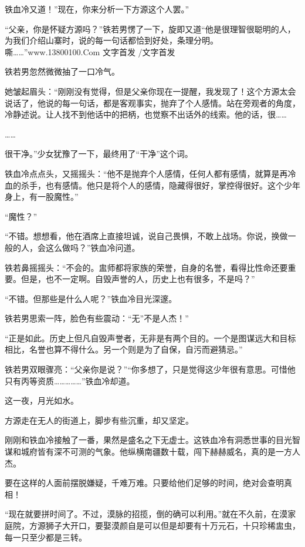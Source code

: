 
\begin{this_body}

铁血冷又道！”现在，你来分析一下方源这个人罢。”

“父亲，你是怀疑方源吗？”铁若男愣了一下，旋即又道“他是很理智很聪明的人，为我们介绍山寨时，说的每一句话都恰到好处，条理分明。嘶……”www.13800100.Com 文字首发 /文字首发

铁若男忽然微微抽了一口冷气。

她皱起眉头：“刚刚没有觉得，但是父亲你现在一提醒，我发现了！这个方源太会说话了，他说的每一句话，都是客观事实，抛弃了个人感情。站在旁观者的角度，冷静述说。让人找不到他话中的把柄，也觉察不出话外的线索。他的话，很……

……

很干净。”少女犹豫了一下，最终用了“干净”这个词。

铁血冷点点头，又摇摇头：“他不是抛弃个人感情，任何人都有感情，就算是再冷血的杀手，也有感情。他只是将个人的感情，隐藏得很好，掌控得很好。这个少年身上，有一股魔性。”

“魔性？”

“不错。想想看，他在酒席上直接坦诚，说自己畏惧，不敢上战场。你说，换做一般的人，会这么做吗？”铁血冷问道。

铁若鼻摇摇头：“不会的。盅师都将家族的荣誉，自身的名誉，看得比性命还要重要。但是，也不一定啊。自毁声誉的人，历史上也有很多，不是吗？”

“不错。但那些是什么人呢？”铁血冷目光深邃。

铁若男思索一阵，脸色有些震动：“无”不是人杰！”

“正是如此。历史上但凡自毁声誉者，无非是有两个目的。一个是图谋远大和目标相比，名誉也算不得什么。另一个则是为了自保，自污而避猜忌。”

铁若男双眼骤亮：“父亲你是说？”“你多想了，只是觉得这少年很有意思。可惜他只有丙等资质……………”铁血冷却道。

这一夜，月光如水。

方源走在无人的街道上，脚步有些沉重，却又坚定。

刚刚和铁血冷接触了一番，果然是盛名之下无虚士。这铁血冷有洞悉世事的目光智谋和城府皆有深不可测的气象。他纵横南疆数十载，闯下赫赫威名，真的是一方人杰。

要在这样的人面前摆脱嫌疑，千难万难。只要给他们足够的时间，绝对会查明真相！

“现在就要拼时间了。不过，漠脉的招揽，倒的确可以利用。”就在不久前，在漠家庭院，方源狮子大开口，要娶漠颜自是可以但是却要有十万元石，十只珍稀盅虫，每一只至少都是三转。


\end{this_body}
